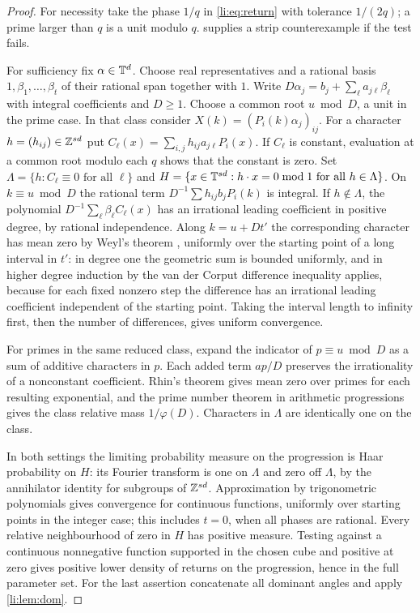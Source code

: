 \begin{proof}
For necessity take the phase $1/q$ in \eqref{li:eq:return} with tolerance $1/(2q)$; a prime
larger than $q$ is a unit modulo $q$.  supplies a strip counterexample if
the test fails.

For sufficiency fix $\alpha\in\mathbb{T}^d$. Choose real representatives and a rational basis
$1,\beta_1,\dots,\beta_t$ of their rational span together with $1$. Write
$D\alpha_j=b_j+\sum_\ell a_{j\ell}\beta_\ell$ with integral coefficients and $D\ge1$. Choose a
common root $u\bmod D$, a unit in the prime case. In that class consider
$X(k)=(P_i(k)\alpha_j)_{ij}$. For a character $h=(h_{ij})\in\mathbb{Z}^{sd}$ put
$C_\ell(x)=\sum_{i,j}h_{ij}a_{j\ell}P_i(x)$. If $C_\ell$ is constant, evaluation at a common
root modulo each $q$ shows that the constant is zero. Set
$\Lambda=\{h:C_\ell\equiv0\text{ for all }\ell\}$ and
$H=\{x\in\mathbb{T}^{sd}:h\cdot x=0\bmod1\text{ for all }h\in\Lambda\}$. On $k\equiv u\bmod D$ the
rational term $D^{-1}\sum h_{ij}b_jP_i(k)$ is integral. If $h\notin\Lambda$, the polynomial
$D^{-1}\sum_\ell\beta_\ell C_\ell(x)$ has an irrational leading coefficient in positive degree,
by rational independence. Along $k=u+Dt'$ the corresponding character has mean zero by Weyl's
theorem \cite{Weyl1916Gleichverteilung}, uniformly over the starting point of a long interval in
$t'$: in degree one the geometric sum is bounded uniformly, and in higher degree induction by the
van der Corput difference inequality applies, because for each fixed nonzero step the difference
has an irrational leading coefficient independent of the starting point. Taking the interval
length to infinity first, then the number of differences, gives uniform convergence.

For primes in the same reduced class, expand the indicator of $p\equiv u\bmod D$ as a sum of
additive characters in $p$. Each added term $ap/D$ preserves the irrationality of a nonconstant
coefficient. Rhin's theorem \cite{Rhin1973Repartition} gives mean zero over primes for each
resulting exponential, and the prime number theorem in arithmetic progressions gives the class
relative mass $1/\varphi(D)$. Characters in $\Lambda$ are identically one on the class.

In both settings the limiting probability measure on the progression is Haar probability on
$H$: its Fourier transform is one on $\Lambda$ and zero off $\Lambda$, by the annihilator identity
for subgroups of $\mathbb{Z}^{sd}$. Approximation by trigonometric polynomials gives convergence for
continuous functions, uniformly over starting points in the integer case; this includes $t=0$,
when all phases are rational. Every relative neighbourhood of zero in $H$ has positive measure.
Testing against a continuous nonnegative function supported in the chosen cube and positive at
zero gives positive lower density of returns on the progression, hence in the full parameter
set. For the last assertion concatenate all dominant angles and apply \cref{li:lem:dom}.
\end{proof}

